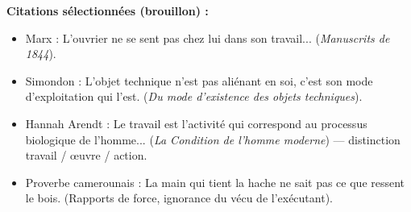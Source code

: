 \documentclass[11pt]{article}
\begin{document}
\begin{exemplebox}
\begin{enumerate}
\begin{enumerate}
        \end{enumerate}
\end{enumerate}
\textbf{Citations s\'electionn\'ees (brouillon) :}
\begin{itemize}
    \item Marx : \guillemotleft L'ouvrier ne se sent pas chez lui dans son travail... \guillemotright (\emph{Manuscrits de 1844}).
    \item Simondon : \guillemotleft L'objet technique n'est pas ali\'enant en soi, c'est son mode d'exploitation qui l'est. \guillemotright (\emph{Du mode d'existence des objets techniques}).
    \item Hannah Arendt : \guillemotleft Le travail est l'activit\'e qui correspond au processus biologique de l'homme... \guillemotright (\emph{La Condition de l'homme moderne}) --- distinction travail / \oe uvre / action.
    \item Proverbe camerounais : \guillemotleft La main qui tient la hache ne sait pas ce que ressent le bois. \guillemotright (Rapports de force, ignorance du v\'ecu de l'ex\'ecutant).
\end{itemize}
\end{exemplebox}
\end{document}
